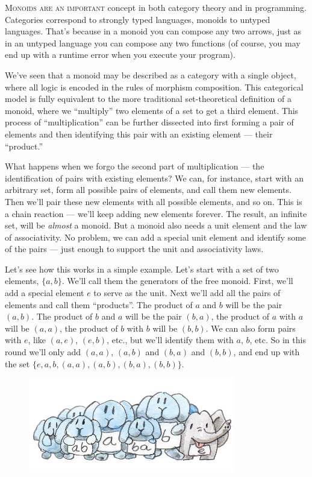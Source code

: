 
\lettrine[lhang=0.17]{M}{onoids are an important} concept in both category
theory and in programming. Categories correspond to strongly typed languages,
monoids to untyped languages. That's because in a monoid you can compose any
two arrows, just as in an untyped language you can compose any two functions
(of course, you may end up with a runtime error when you execute your
program).

We've seen that a monoid may be described as a category with a single
object, where all logic is encoded in the rules of morphism composition.
This categorical model is fully equivalent to the more traditional
set-theoretical definition of a monoid, where we ``multiply'' two
elements of a set to get a third element. This process of
``multiplication'' can be further dissected into first forming a pair of
elements and then identifying this pair with an existing element ---
their ``product.''

What happens when we forgo the second part of multiplication --- the
identification of pairs with existing elements? We can, for instance,
start with an arbitrary set, form all possible pairs of elements, and
call them new elements. Then we'll pair these new elements with all
possible elements, and so on. This is a chain reaction --- we'll keep
adding new elements forever. The result, an infinite set, will be
\emph{almost} a monoid. But a monoid also needs a unit element and the
law of associativity. No problem, we can add a special unit element and
identify some of the pairs --- just enough to support the unit and
associativity laws.

Let's see how this works in a simple example. Let's start with a set of
two elements, $\{a, b\}$. We'll call them the generators of the
free monoid. First, we'll add a special element $e$ to serve as
the unit. Next we'll add all the pairs of elements and call them
``products''. The product of $a$ and $b$ will be the pair
$(a, b)$. The product of $b$ and $a$ will be the
pair $(b, a)$, the product of $a$ with $a$ will be
$(a, a)$, the product of $b$ with $b$ will be
$(b, b)$. We can also form pairs with $e$, like
$(a, e)$, $(e, b)$, etc., but we'll identify them with
$a$, $b$, etc. So in this round we'll only add
$(a, a)$, $(a, b)$ and $(b, a)$ and
$(b, b)$, and end up with the set
$\{e, a, b, (a, a), (a, b), (b, a), (b, b)\}$.

\begin{figure}[H]
  \centering
  \includegraphics[width=0.8\textwidth]{images/bunnies.jpg}
\end{figure}

